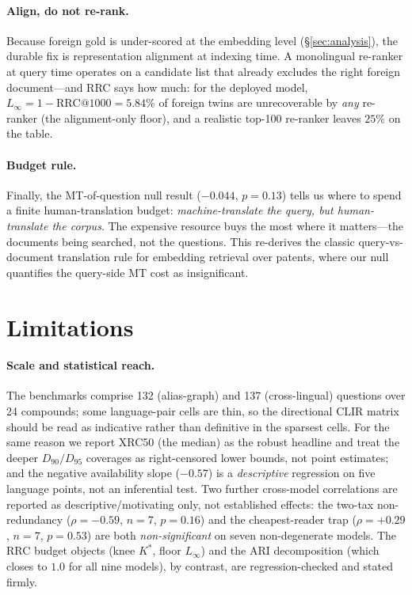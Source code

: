 \documentclass[11pt]{article}
\begin{document}
\paragraph{Align, do not re-rank.}
Because foreign gold is under-scored at the embedding level
(\S\ref{sec:analysis}), the durable fix is representation alignment at indexing
time. A monolingual re-ranker at query time operates on a candidate list that
already excludes the right foreign document---and RRC says how much: for the
deployed model, $L_\infty = 1-\mathrm{RRC@1000}=5.84\%$ of foreign twins are
unrecoverable by \emph{any} re-ranker (the alignment-only floor), and a realistic
top-100 re-ranker leaves $25\%$ on the table.

\paragraph{Budget rule.}
Finally, the MT-of-question null result ($-0.044$, $p=0.13$) tells us where to
spend a finite human-translation budget: \emph{machine-translate the query, but
human-translate the corpus}. The expensive resource buys the most where it
matters---the documents being searched, not the questions. This re-derives the
classic query-vs-document translation rule \citep{oard1998,salehpecina2020} for
embedding retrieval over patents, where our null quantifies the query-side MT
cost as insignificant.

\section*{Limitations}

\paragraph{Scale and statistical reach.}
The benchmarks comprise 132 (alias-graph) and 137 (cross-lingual) questions over
24 compounds; some language-pair cells are thin, so the directional CLIR matrix
should be read as indicative rather than definitive in the sparsest cells. For
the same reason we report XRC50 (the median) as the robust headline and treat
the deeper $D_{90}/D_{95}$ coverages as right-censored lower bounds, not point
estimates; and the negative availability slope ($-0.57$) is a \emph{descriptive}
regression on five language points, not an inferential test. Two further
cross-model correlations are reported as descriptive/motivating only, not
established effects: the two-tax non-redundancy
($\rho{=}{-}0.59$, $n{=}7$, $p{=}0.16$) and the cheapest-reader trap
($\rho{=}{+}0.29$, $n{=}7$, $p{=}0.53$) are both \emph{non-significant} on seven
non-degenerate models. The RRC budget objects (knee $K^{\!*}$, floor $L_\infty$)
and the ARI decomposition (which closes to $1.0$ for all nine models), by
contrast, are regression-checked and stated firmly.
\end{document}
